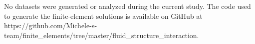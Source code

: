 No datasets were generated or analyzed during the current study. The code used to generate the finite-element solutions is available on GitHub at https://github.com/Michele-s-team/finite_elements/tree/master/fluid_structure_interaction.